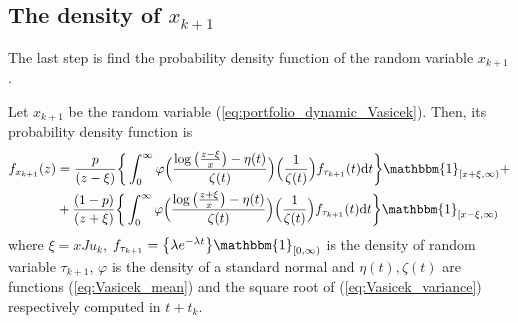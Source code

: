 \subsection{The density of $x_{k+1}$}
The last step is find the probability density function of the random variable $x_{k+1}$. 
\begin{proposition}
	Let $x_{k+1}$ be the random variable (\ref{eq:portfolio_dynamic_Vasicek}). Then, its probability density function is
	\begin{align*}
	f_{x_{k+1}}(z) &=\frac{p}{(z-\xi)}\bigg\{ \int_{0}^{\infty}\varphi\Big(\frac{\log\big(\frac{z-\xi}{x}\big)-\eta(t)}{\zeta(t)}\Big)\Big(\frac{1}{\zeta(t)}\Big)f_{\tau_{k+1}}(t)\mathrm{d}t\bigg\}\mathbbm{1}_{[x+\xi,\infty)} \nonumber +\\
	& + \frac{(1-p)}{(z+\xi)}\bigg\{ \int_{0}^{\infty}\varphi\Big(\frac{\log\big(\frac{z+\xi}{x}\big)-\eta(t)}{\zeta(t)}\Big)\Big(\frac{1}{\zeta(t)}\Big)f_{\tau_{k+1}}(t)\mathrm{d}t\bigg\}\mathbbm{1}_{[x-\xi,\infty)}
	\end{align*}
	where $\xi=xJu_k$, $f_{\tau_{k+1}}= \big\{\lambda e^{-\lambda t}\big\}\mathbbm{1}_{[0,\infty)}$ is the density of random variable $\tau_{k+1}$, $\varphi$ is the density of a standard normal and $\eta(t),\zeta(t)$ are functions (\ref{eq:Vasicek_mean}) and the square root of (\ref{eq:Vasicek_variance}) respectively computed in $t+t_k$.
\end{proposition}
